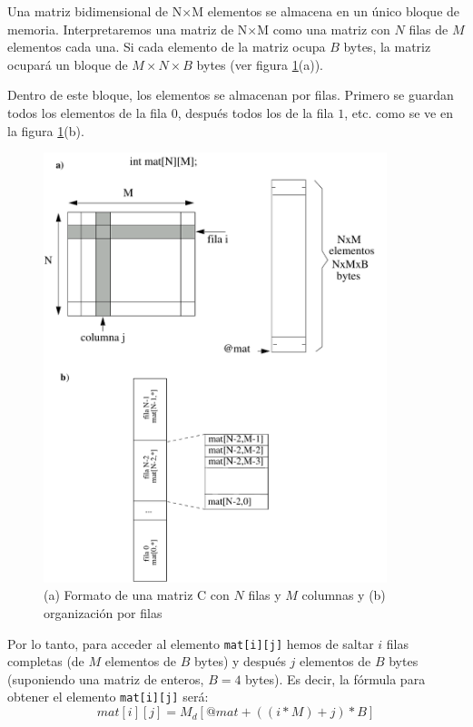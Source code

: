  Una matriz bidimensional de N$\times$M
elementos se almacena en un único bloque de memoria. Interpretaremos
una matriz de N$\times$M como una matriz con $N$ filas de $M$ elementos cada
una. Si cada elemento de la matriz ocupa $B$ bytes, la matriz ocupará un
bloque de  $M \times N \times B$ bytes (ver figura \ref{fig:dos_5}(a)).

Dentro de este bloque, los elementos se almacenan por filas. Primero
se guardan todos los elementos de la fila $0$, después todos los de la
fila $1$, etc. como se ve en la figura \ref{fig:dos_5}(b).


\begin{figure}[h]
  \centering
    \includegraphics[width=10cm]{graphs/2-5.pdf}
  \caption{(a) Formato de una matriz  C con $N$ filas y $M$ columnas y (b)
organización por filas}
  \label{fig:dos_5}
\end{figure}

Por lo tanto, para acceder al elemento {\tt mat[i][j]} hemos de saltar
$i$ filas completas (de $M$ elementos de $B$ bytes) y después $j$
elementos de $B$ bytes (suponiendo una matriz de enteros, $B= 4$ bytes). Es
decir, la fórmula para obtener el elemento {\tt mat[i][j]} será:
\begin{equation}
mat[i][j] = M_d[@mat + ((i*M)+j)*B] 
\label{eq:accesoelemmatriz}
\end{equation}


